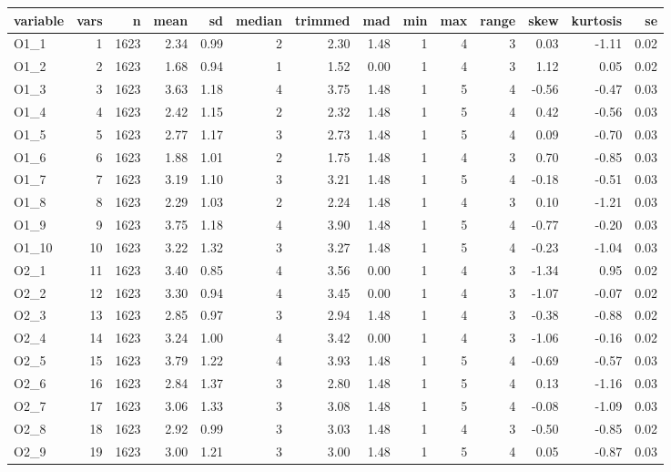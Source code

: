 
\begin{tabular}{lrrrrrrrrrrrrr}
\toprule
variable & vars & n & mean & sd & median & trimmed & mad & min & max & range & skew & kurtosis & se\\
\midrule
O1\_1 & 1 & 1623 & 2.34 & 0.99 & 2 & 2.30 & 1.48 & 1 & 4 & 3 & 0.03 & -1.11 & 0.02\\
O1\_2 & 2 & 1623 & 1.68 & 0.94 & 1 & 1.52 & 0.00 & 1 & 4 & 3 & 1.12 & 0.05 & 0.02\\
O1\_3 & 3 & 1623 & 3.63 & 1.18 & 4 & 3.75 & 1.48 & 1 & 5 & 4 & -0.56 & -0.47 & 0.03\\
O1\_4 & 4 & 1623 & 2.42 & 1.15 & 2 & 2.32 & 1.48 & 1 & 5 & 4 & 0.42 & -0.56 & 0.03\\
O1\_5 & 5 & 1623 & 2.77 & 1.17 & 3 & 2.73 & 1.48 & 1 & 5 & 4 & 0.09 & -0.70 & 0.03\\
\addlinespace
O1\_6 & 6 & 1623 & 1.88 & 1.01 & 2 & 1.75 & 1.48 & 1 & 4 & 3 & 0.70 & -0.85 & 0.03\\
O1\_7 & 7 & 1623 & 3.19 & 1.10 & 3 & 3.21 & 1.48 & 1 & 5 & 4 & -0.18 & -0.51 & 0.03\\
O1\_8 & 8 & 1623 & 2.29 & 1.03 & 2 & 2.24 & 1.48 & 1 & 4 & 3 & 0.10 & -1.21 & 0.03\\
O1\_9 & 9 & 1623 & 3.75 & 1.18 & 4 & 3.90 & 1.48 & 1 & 5 & 4 & -0.77 & -0.20 & 0.03\\
O1\_10 & 10 & 1623 & 3.22 & 1.32 & 3 & 3.27 & 1.48 & 1 & 5 & 4 & -0.23 & -1.04 & 0.03\\
\addlinespace
O2\_1 & 11 & 1623 & 3.40 & 0.85 & 4 & 3.56 & 0.00 & 1 & 4 & 3 & -1.34 & 0.95 & 0.02\\
O2\_2 & 12 & 1623 & 3.30 & 0.94 & 4 & 3.45 & 0.00 & 1 & 4 & 3 & -1.07 & -0.07 & 0.02\\
O2\_3 & 13 & 1623 & 2.85 & 0.97 & 3 & 2.94 & 1.48 & 1 & 4 & 3 & -0.38 & -0.88 & 0.02\\
O2\_4 & 14 & 1623 & 3.24 & 1.00 & 4 & 3.42 & 0.00 & 1 & 4 & 3 & -1.06 & -0.16 & 0.02\\
O2\_5 & 15 & 1623 & 3.79 & 1.22 & 4 & 3.93 & 1.48 & 1 & 5 & 4 & -0.69 & -0.57 & 0.03\\
\addlinespace
O2\_6 & 16 & 1623 & 2.84 & 1.37 & 3 & 2.80 & 1.48 & 1 & 5 & 4 & 0.13 & -1.16 & 0.03\\
O2\_7 & 17 & 1623 & 3.06 & 1.33 & 3 & 3.08 & 1.48 & 1 & 5 & 4 & -0.08 & -1.09 & 0.03\\
O2\_8 & 18 & 1623 & 2.92 & 0.99 & 3 & 3.03 & 1.48 & 1 & 4 & 3 & -0.50 & -0.85 & 0.02\\
O2\_9 & 19 & 1623 & 3.00 & 1.21 & 3 & 3.00 & 1.48 & 1 & 5 & 4 & 0.05 & -0.87 & 0.03\\

\end{tabular}
